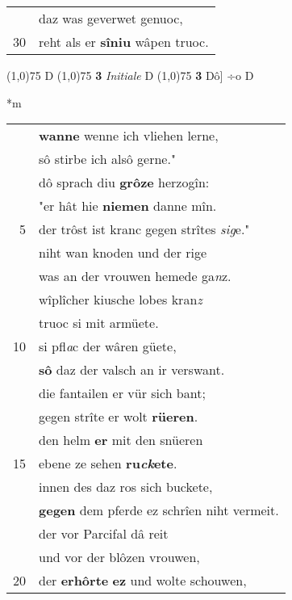 \documentclass[8pt,a4paper,notitlepage]{article}
\begin{document}
\begin{table}[ht]
\begin{minipage}[t]{0.5\linewidth}
\begin{tabular}{rl}
 & daz was geverwet genuoc,\\ 
30 & reht als er \textbf{sîniu} wâpen truoc.\\ 
\end{tabular}
\scriptsize
\line(1,0){75} \newline
D \newline
\line(1,0){75} \newline
\textbf{3} \textit{Initiale} D  \newline
\line(1,0){75} \newline
\textbf{3} Dô] ÷o D \newline
\end{minipage}
\hspace{0.5cm}
\begin{minipage}[t]{0.5\linewidth}
\small
\begin{center}*m
\end{center}
\begin{tabular}{rl}
 & \textbf{wanne} wenne ich vliehen lerne,\\ 
 & sô stirbe ich alsô gerne."\\ 
 & dô sprach diu \textbf{grôze} herzogîn:\\ 
 & "er hât hie \textbf{niemen} danne mîn.\\ 
5 & der trôst ist kranc gegen strîtes \textit{sig}e."\\ 
 & niht wan knoden und der rige\\ 
 & was an der vrouwen hemede ga\textit{n}z.\\ 
 & wîplîcher kiusche lobes kran\textit{z}\\ 
 & truoc si mit armüete.\\ 
10 & si pfl\textit{a}c der wâren güete,\\ 
 & \textbf{sô} daz der valsch an ir verswant.\\ 
 & die fantailen er vür sich bant;\\ 
 & gegen strîte er wolt \textbf{rüeren}.\\ 
 & den helm \textbf{er} mit den snüeren\\ 
15 & ebene ze sehen \textbf{ru\textit{ck}ete}.\\ 
 & innen des daz ros sich buckete,\\ 
 & \textbf{gegen} dem pferde ez schrîen niht vermeit.\\ 
 & der vor Parcifal dâ reit\\ 
 & und vor der blôzen vrouwen,\\ 
20 & der \textbf{erhôrte} \textbf{ez} und wolte schouwen,\\ 

\end{tabular}
\end{minipage}
\end{table}
\end{document}
